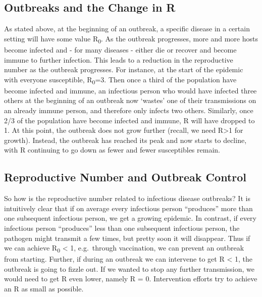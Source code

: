\documentclass[]{article}
\theoremstyle{definition}
\theoremstyle{definition}
\theoremstyle{definition}
\theoremstyle{remark}
\begin{document}
\subsection{Outbreaks and the Change in
R}\label{outbreaks-and-the-change-in-r}

As stated above, at the beginning of an outbreak, a specific disease in
a certain setting will have some value R\textsubscript{0}. As the
outbreak progresses, more and more hosts become infected and - for many
diseases - either die or recover and become immune to further infection.
This leads to a reduction in the reproductive number as the outbreak
progresses. For instance, at the start of the epidemic with everyone
susceptible, R\textsubscript{0}=3. Then once a third of the population
have become infected and immune, an infectious person who would have
infected three others at the beginning of an outbreak now `wastes' one
of their transmissions on an already immune person, and therefore only
infects two others. Similarly, once 2/3 of the population have become
infected and immune, R will have dropped to 1. At this point, the
outbreak does not grow further (recall, we need R\textgreater{}1 for
growth). Instead, the outbreak has reached its peak and now starts to
decline, with R continuing to go down as fewer and fewer susceptibles
remain.

\subsection{Reproductive Number and Outbreak
Control}\label{reproductive-number-and-outbreak-control}

So how is the reproductive number related to infectious disease
outbreaks? It is intuitively clear that if on average every infectious
person ``produces'' more than one subsequent infectious person, we get a
growing epidemic. In contrast, if every infectious person ``produces''
less than one subsequent infectious person, the pathogen might transmit
a few times, but pretty soon it will disappear. Thus if we can achieve
R\textsubscript{0} \textless{} 1, e.g.~through vaccination, we can
prevent an outbreak from starting. Further, if during an outbreak we can
intervene to get R \textless{} 1, the outbreak is going to fizzle out.
If we wanted to stop any further transmission, we would need to get R
even lower, namely R = 0. Intervention efforts try to achieve an R as
small as possible.
\end{document}
